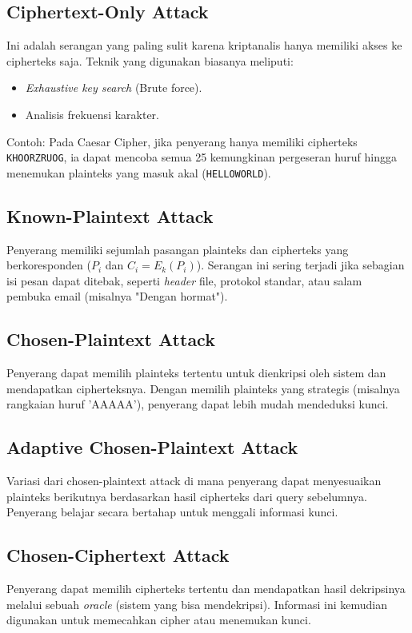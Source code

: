 \documentclass[../main.tex]{subfiles}
\begin{document}
\subsection{Ciphertext-Only Attack}
Ini adalah serangan yang paling sulit karena kriptanalis hanya memiliki akses ke cipherteks saja. Teknik yang digunakan biasanya meliputi:
\begin{itemize}
    \item \textit{Exhaustive key search} (Brute force).
    \item Analisis frekuensi karakter.
\end{itemize}
Contoh: Pada Caesar Cipher, jika penyerang hanya memiliki cipherteks \texttt{KHOORZRUOG}, ia dapat mencoba semua 25 kemungkinan pergeseran huruf hingga menemukan plainteks yang masuk akal (\texttt{HELLOWORLD}).

\subsection{Known-Plaintext Attack}
Penyerang memiliki sejumlah pasangan plainteks dan cipherteks yang berkoresponden ($P_i$ dan $C_i = E_k(P_i)$). Serangan ini sering terjadi jika sebagian isi pesan dapat ditebak, seperti \textit{header} file, protokol standar, atau salam pembuka email (misalnya "Dengan hormat").

\subsection{Chosen-Plaintext Attack}
Penyerang dapat memilih plainteks tertentu untuk dienkripsi oleh sistem dan mendapatkan cipherteksnya. Dengan memilih plainteks yang strategis (misalnya rangkaian huruf 'AAAAA'), penyerang dapat lebih mudah mendeduksi kunci.

\subsection{Adaptive Chosen-Plaintext Attack}
Variasi dari chosen-plaintext attack di mana penyerang dapat menyesuaikan plainteks berikutnya berdasarkan hasil cipherteks dari query sebelumnya. Penyerang belajar secara bertahap untuk menggali informasi kunci.

\subsection{Chosen-Ciphertext Attack}
Penyerang dapat memilih cipherteks tertentu dan mendapatkan hasil dekripsinya melalui sebuah \textit{oracle} (sistem yang bisa mendekripsi). Informasi ini kemudian digunakan untuk memecahkan cipher atau menemukan kunci.
\end{document}
